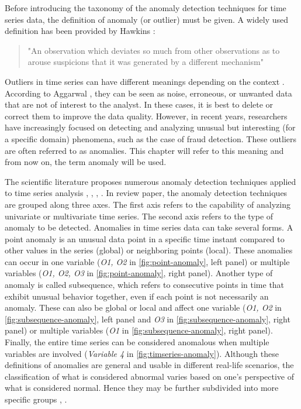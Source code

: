 Before introducing the taxonomy of the anomaly detection techniques for time series data, the definition of anomaly (or outlier) must be given. A widely used definition has been provided by Hawkins \cite{hawkins1980identification}:
\begin{quote}
"An observation which deviates so much from other observations as to arouse suspicions that it was generated by a different mechanism"
\end{quote}
Outliers in time series can have different meanings depending on the context \cite{blazquez2020review}. According to Aggarwal \cite{aggarwal_2016}, they can be seen as noise, erroneous, or unwanted data that are not of interest to the analyst. In these cases, it is best to delete or correct them to improve the data quality. However, in recent years, researchers have increasingly focused on detecting and analyzing unusual but interesting (for a specific domain) phenomena, such as the case of fraud detection. These outliers are often referred to as anomalies. This chapter will refer to this meaning and from now on, the term anomaly will be used. 

The scientific literature proposes numerous anomaly detection techniques applied to time series analysis \cite{chandola_2019}, \cite{blazquez2020review}, \cite{choi2021deep}, \cite{Garg_2021}. In \cite{blazquez2020review} review paper, the anomaly detection techniques are grouped along three axes. The first axis refers to the capability of analyzing univariate or multivariate time series. The second axis refers to the type of anomaly to be detected. Anomalies in time series data can take several forms. A point anomaly is an unusual data point in a specific time instant compared to other values in the series (global) or neighboring points (local). These anomalies can occur in one variable (\textit{O1, O2} in \autoref{fig:point-anomaly}, left panel) or multiple variables (\textit{O1, O2, O3} in \autoref{fig:point-anomaly}, right panel). Another type of anomaly is called subsequence, which refers to consecutive points in time that exhibit unusual behavior together, even if each point is not necessarily an anomaly. These can also be global or local and affect one variable (\textit{O1, O2} in \autoref{fig:subsequence-anomaly}, left panel and \textit{O3} in \autoref{fig:subsequence-anomaly}, right panel) or multiple variables (\textit{O1} in \autoref{fig:subsequence-anomaly}, right panel). Finally, the entire time series can be considered anomalous when multiple variables are involved (\textit{Variable 4} in \autoref{fig:timseries-anomaly}). Although these definitions of anomalies are general and usable in different real-life scenarios, the classification of what is considered abnormal varies based on one's perspective of what is considered normal. Hence they may be further subdivided into more specific groups \cite{choi2021deep}, \cite{Tang_2018}. 

